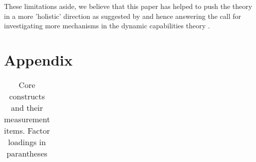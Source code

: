 \documentclass[review,fleqn]{elsarticle}\usepackage[]{graphicx}\usepackage[]{color}
\begin{document}
These limitations aside, we believe that this paper has helped to push the theory in a
more 'holistic' direction as suggested by \cite{Verona2011} and hence answering the call
for investigating more mechanisms in the dynamic capabilities theory \citep{Schilke2018}.




%


\newpage
\section*{Appendix}

\begin{table}[h]
  \label{tab:items}
    \caption{Core constructs and their measurement items. Factor
      loadings in parantheses}



\scriptsize
\singlespacing
{}



\begin{tabular}{p{2cm} c p{9cm}}


\end{tabular}
\end{table}
\end{document}
